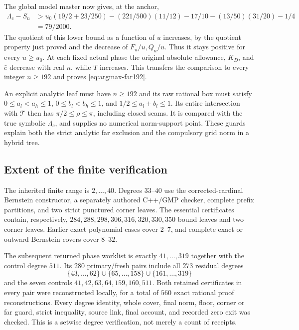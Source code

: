 The global model master now gives, at the anchor,
\begin{align*}
 \Lambda_c-S_n&>
 u_0(19/2+23/250)-(221/500)(11/12)
                   -17/10-(13/50)(31/20)-1/4\\
 &=79/2000.
\end{align*}
The quotient of this lower bound as a function of $u$ increases,
by the quotient property just proved and the decrease of $F_u/u,Q_u/u$.
Thus it stays positive for every $u\geq u_0$.  At each fixed actual
phase the original absolute allowance, $K_D$, and $\bar e$ decrease
with real $n$, while $T$ increases.  This transfers the comparison to
every integer $n\geq192$ and proves \eqref{eq:argmax-far192}.

An explicit analytic leaf must have $n\geq192$ and its raw rational
box must satisfy $0\leq a_l<a_h\leq1$, $0\leq b_l<b_h\leq1$,
and $1/2\leq a_l+b_l\leq1$.  Its entire intersection with
$\mathcal T$ then has $\pi/2\leq\rho\leq\pi$, including closed seams.
It is compared with the true symbolic $\Lambda_c$, and supplies no
numerical norm-support point.  These guards explain both the strict
analytic far exclusion and the compulsory grid norm in a hybrid tree.

\subsection{Extent of the finite verification}
\label{app:argmax-verification-record}

The inherited finite range is $2,\ldots,40$.  Degrees $33$--$40$ use
the corrected-cardinal Bernstein constructor, a separately authored
C++/GMP checker, complete prefix partitions, and two strict punctured
corner leaves.  The essential certificates contain, respectively,
$284,288,298,306,316,320,330,350$ bound leaves and two corner leaves.
Earlier exact polynomial cases cover $2$--$7$, and complete exact or
outward Bernstein covers cover $8$--$32$.

The subsequent returned phase worklist is exactly $41,\ldots,319$
together with the control degree $511$.  Its $280$ primary/fresh pairs
include all $273$ residual degrees
\[
 \{43,\ldots,62\}\cup\{65,\ldots,158\}\cup\{161,\ldots,319\}
\]
and the seven controls $41,42,63,64,159,160,511$.  Both retained
certificates in every pair were reconstructed locally, for a total of
$560$ exact rational proof reconstructions.  Every degree identity,
whole cover, final norm, floor, corner or far guard, strict inequality,
source link, final account, and recorded zero exit was checked.
This is a setwise degree verification, not merely a count of receipts.

